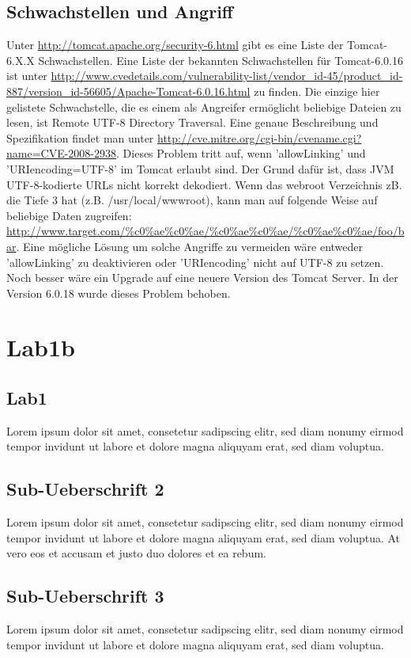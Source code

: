 \documentclass[12pt,a4paper,titlepage,oneside]{scrartcl}
\begin{document}
\subsection{Schwachstellen und Angriff}
Unter \url{http://tomcat.apache.org/security-6.html} gibt es eine Liste der Tomcat-6.X.X Schwachstellen. Eine Liste der bekannten Schwachstellen für Tomcat-6.0.16 ist unter \url{http://www.cvedetails.com/vulnerability-list/vendor_id-45/product_id-887/version_id-56605/Apache-Tomcat-6.0.16.html} zu finden.
Die einzige hier gelistete Schwachstelle, die es einem als Angreifer ermöglicht beliebige Dateien zu lesen, ist Remote UTF-8 Directory Traversal. Eine genaue Beschreibung und Spezifikation findet man unter \url{http://cve.mitre.org/cgi-bin/cvename.cgi?name=CVE-2008-2938}. Dieses Problem tritt auf, wenn 'allowLinking' und 'URIencoding=UTF-8' im Tomcat erlaubt sind. Der Grund dafür ist, dass JVM UTF-8-kodierte URLs nicht korrekt dekodiert. Wenn das webroot Verzeichnis zB. die Tiefe 3 hat (z.B. /usr/local/wwwroot), kann man auf folgende Weise auf beliebige Daten zugreifen: \url{http://www.target.com/%c0%ae%c0%ae/%c0%ae%c0%ae/%c0%ae%c0%ae/foo/bar}. Eine mögliche Lösung um solche Angriffe zu vermeiden wäre entweder 'allowLinking' zu deaktivieren oder 'URIencoding' nicht auf UTF-8 zu setzen. Noch besser wäre ein Upgrade auf eine neuere Version des Tomcat Server. In der Version 6.0.18 wurde dieses Problem behoben.


\section{Lab1b}

\subsection{Lab1}
Lorem ipsum dolor sit amet, consetetur sadipscing elitr, sed diam nonumy eirmod tempor invidunt ut labore et dolore magna aliquyam erat, sed diam voluptua. 

\subsection{Sub-Ueberschrift 2}
Lorem ipsum dolor sit amet, consetetur sadipscing elitr, sed diam nonumy eirmod tempor invidunt ut labore et dolore magna aliquyam erat, sed diam voluptua. At vero eos et accusam et justo duo dolores et ea rebum. 

\subsection{Sub-Ueberschrift 3}
Lorem ipsum dolor sit amet, consetetur sadipscing elitr, sed diam nonumy eirmod tempor invidunt ut labore et dolore magna aliquyam erat, sed diam voluptua.
\end{document}
